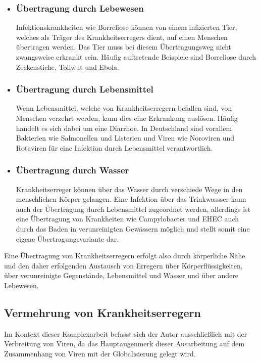 \documentclass[12pt]{article}
\begin{document}
\begin{itemize}
    \item \subsubsection{Übertragung durch Lebewesen}
    Infektionskrankheiten wie Borreliose können von einem infizierten Tier, welches als Träger des Krankheitserregers dient, auf einen Menschen übertragen werden. Das Tier muss bei diesem Übertragungsweg nicht zwangsweise erkrankt sein. Häufig auftretende Beispiele sind Borreliose durch Zeckenstiche, Tollwut und Ebola.
    \item \subsubsection{Übertragung durch Lebensmittel}
    Wenn Lebensmittel, welche von Krankheitserregern befallen sind, von Menschen verzehrt werden, kann dies eine Erkrankung auslösen. Häufig handelt es sich dabei um eine Diarrhoe. In Deutschland sind vorallem Bakterien wie Salmonellen und Listerien und Viren wie Noroviren und Rotaviren für eine Infektion durch Lebensmittel verantwortlich.
    \item \subsubsection{Übertragung durch Wasser}
    Krankheitserreger können über das Wasser durch verschiede Wege in den menschlichen Körper gelangen. Eine Infektion über das Trinkwassser kann auch der Übertragung durch Lebensmittel zugeordnet werden, allerdings ist eine Übertragung von Krankheiten wie Campylobacter und EHEC auch durch das Baden in verunreinigten Gewässern möglich und stellt somit eine eigene Übertragungsvariante dar.
\end{itemize}
Eine Übertragung von Krankheitserregern erfolgt also durch körperliche Nähe und den daher erfolgenden Austausch von Erregern über Körperflüssigkeiten, über verunreinigte Gegenstände, Lebensmittel und Wasser und über andere Lebewesen.
\subsection{Vermehrung von Krankheitserregern}
Im Kontext dieser Komplexarbeit befasst sich der Autor ausschließlich mit der Verbreitung von Viren, da das Hauptaugenmerk dieser Ausarbeitung auf dem Zusammenhang von Viren mit der Globalisierung gelegt wird.
\end{document}
